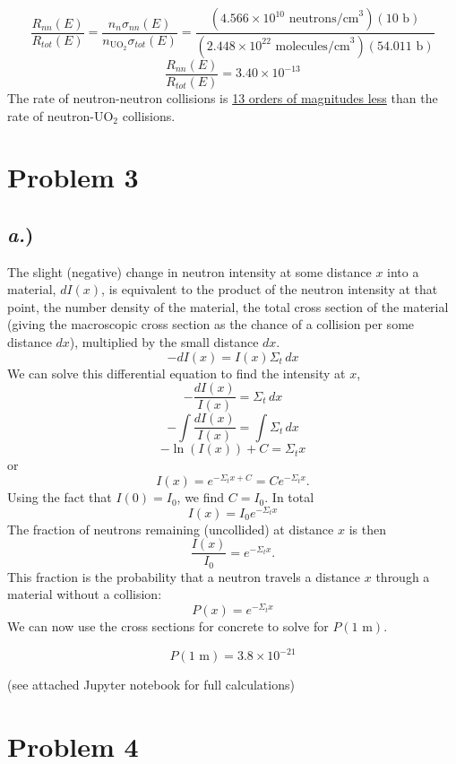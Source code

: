 \documentclass{article}
\begin{document}
$$ \frac{R_{nn}(E)}{R_{tot}(E)} = \frac{n_n \sigma_{nn}(E)}{n_{\text{UO}_2} \sigma_{tot}(E)} = \frac{(4.566\times10^{10}\text{ neutrons/cm}^3)(10\text{ b})}{(2.448\times10^{22}\text{ molecules/cm}^3)(54.011\text{ b})}$$
$$ \frac{R_{nn}(E)}{R_{tot}(E)} = 3.40\times10^{-13} $$
The rate of neutron-neutron collisions is \underline{13 orders of magnitudes less} than the rate of neutron-UO$_2$ collisions.



\newpage

\section*{Problem 3}

\subsection*{\textit{a.})}

The slight (negative) change in neutron intensity at some distance $x$ into a material, $dI(x)$, is equivalent to the product of the neutron intensity at that point, the number density of the material, the total cross section of the material (giving the macroscopic cross section as the chance of a collision per some distance $dx$), multiplied by the small distance $dx$.
$$ -dI(x) = I(x)\Sigma_t \,dx $$
We can solve this differential equation to find the intensity at $x$,
$$ -\frac{dI(x)}{I(x)} = \Sigma_t \, dx $$
$$ -\int\frac{dI(x)}{I(x)} = \int\Sigma_t \, dx $$
$$ - \ln(I(x)) + C= \Sigma_t x $$
or
$$ I(x) = e^{-\Sigma_t x + C} = Ce^{-\Sigma_t x}.$$
Using the fact that $I(0) = I_0$, we find $C=I_0$. In total
$$ I(x) = I_0 e^{-\Sigma_t x} $$
The fraction of neutrons remaining (uncollided) at distance $x$ is then
$$ \frac{I(x)}{I_0} = e^{-\Sigma_t x} .$$
This fraction is the probability that a neutron travels a distance $x$ through a material without a collision:
$$ P(x) = e^{-\Sigma_t x} $$
We can now use the cross sections for concrete to solve for $P(1\text{ m})$.

$$\boxed{ P(1\text{ m}) = 3.8\times10^{-21} }$$

(see attached Jupyter notebook for full calculations)




\section*{Problem 4}
\end{document}
